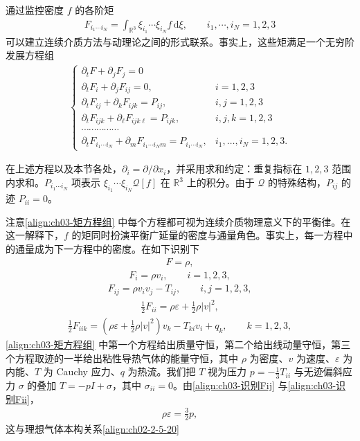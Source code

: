 ﻿\documentclass[../../main.tex]{subfiles}
\begin{document}
通过监控密度 $f$ 的各阶矩
\begin{align}
F_{i_{1}\cdots i_{N}}=\int_{\mathbb{R}^{3}}\xi_{i_{1}}\cdots\xi_{i_{N}}f\,\mathrm{d}\xi,\qquad i_{1},\cdots,i_{N}=1,2,3
\label{align:ch03-矩}
\end{align}
可以建立连续介质方法与动理论之间的形式联系。事实上，这些矩满足一个无穷阶发展方程组
\begin{align}
\begin{cases}
\partial_{t}F+\partial_{j}F_{j}=0\\
\partial_{t}F_{i}+\partial_{j}F_{ij}=0, & i=1,2,3\\
\partial_{t}F_{ij}+\partial_{k}F_{ijk}=P_{ij}, & i,j=1,2,3\\
\partial_{t}F_{ijk}+\partial_{\ell}F_{ijk\ell}=P_{ijk}, & i,j,k=1,2,3\\
\cdots\cdots\cdots\cdots\cdots\\
\partial_{t}F_{i_{1}\cdots i_{N}}+\partial_{m}F_{i_{1}\cdots i_{N}m}=P_{i_{1}\cdots i_{N}}, & i_{1},\ldots,i_{N}=1,2,3.
\end{cases}
\label{align:ch03-矩方程组}
\end{align}

在上述方程以及本节各处，$\partial_{i}=\partial/\partial x_{i}$，并采用求和约定：重复指标在 $1,2,3$ 范围内求和。$P_{i_{1}\cdots i_{N}}$ 项表示 $\xi_{i_{1}}\cdots\xi_{i_{N}}\mathcal{Q}[f]$ 在 $\mathbb{R}^{3}$ 上的积分。由于 $\mathcal{Q}$ 的特殊结构，$P_{ij}$ 的迹 $P_{ii}=0$。

注意\eqref{align:ch03-矩方程组} 中每个方程都可视为连续介质物理意义下的平衡律。在这一解释下，$f$ 的矩同时扮演平衡广延量的密度与通量角色。事实上，每一方程中的通量成为下一方程中的密度。在如下识别下
\begin{align}
F=\rho,
\label{align:ch03-识别F}
\end{align}
\begin{align}
F_{i}=\rho v_{i},\qquad i=1,2,3,
\label{align:ch03-识别Fi}
\end{align}
\begin{align}
F_{ij}=\rho v_{i}v_{j}-T_{ij},\qquad i,j=1,2,3,
\label{align:ch03-识别Fij}
\end{align}
\begin{align}
\frac{1}{2}F_{ii}=\rho\varepsilon+\frac{1}{2}\rho|v|^{2},
\label{align:ch03-识别Fii}
\end{align}
\begin{align}
\frac{1}{2}F_{iik}=\left(\rho\varepsilon+\frac{1}{2}\rho|v|^{2}\right)v_{k}-T_{ki}v_{i}+q_{k},\qquad k=1,2,3,
\label{align:ch03-识别F iik}
\end{align}
\eqref{align:ch03-矩方程组} 中第一个方程给出质量守恒，第二个给出线动量守恒，第三个方程取迹的一半给出粘性导热气体的能量守恒，其中 $\rho$ 为密度、$v$ 为速度、$\varepsilon$ 为内能、$T$ 为 Cauchy 应力、$q$ 为热流。我们把 $T$ 视为压力 $p=-\frac{1}{3}T_{ii}$ 与无迹偏斜应力 $\sigma$ 的叠加 $T=-pI+\sigma$，其中 $\sigma_{ii}=0$。由\eqref{align:ch03-识别Fij} 与\eqref{align:ch03-识别Fii}，
\begin{align}
\rho\varepsilon=\frac{3}{2}p,
\label{align:ch03-理想气体关系}
\end{align}
这与理想气体本构关系\eqref{align:ch02-2-5-20}%
\end{document}
